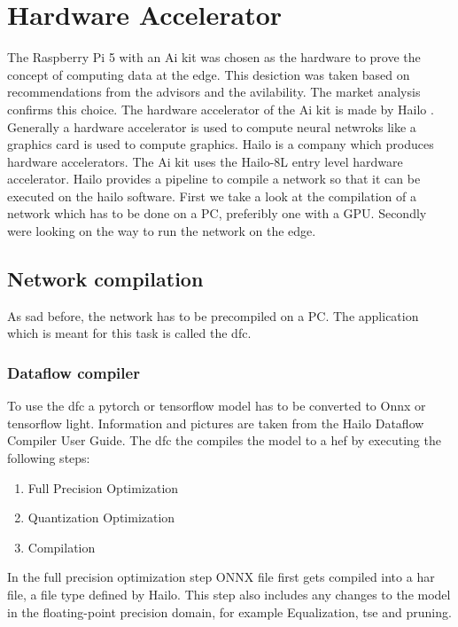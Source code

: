 \chapter{Hardware Accelerator}

The Raspberry Pi 5 with an Ai kit was chosen as the hardware to prove the concept of computing data at the edge.
This desiction was taken based on recommendations from the advisors and the avilability.
The market analysis confirms this choice.
The hardware accelerator of the Ai kit is made by Hailo \cite{hailo}.
Generally a hardware accelerator is used to compute neural netwroks like a graphics card is used to compute graphics.
Hailo is a company which produces hardware accelerators.
The Ai kit uses the Hailo-8L entry level hardware accelerator.
Hailo provides a pipeline to compile a network so that it can be executed on the hailo software.
First we take a look at the compilation of a network which has to be done on a PC, 
preferibly one with a GPU.
Secondly were looking on the way to run the network on the edge.

\section{Network compilation}
As sad before, the network has to be precompiled on a PC.
The application which is meant for this task is called the \Acrfull{dfc}.

\subsection{Dataflow compiler
\label{section:dfc}}

To use the \acrshort{dfc} a pytorch or tensorflow model has to be converted to Onnx or tensorflow light.
Information and pictures are taken from the Hailo Dataflow Compiler User Guide\cite{hailo_dataflow_compiler}.
The \acrshort{dfc} the compiles the model to a \Acrfull{hef} by executing the following steps:

\begin{enumerate}
    \item Full Precision Optimization
    \item Quantization Optimization
    \item Compilation
\end{enumerate}
In the full precision optimization step ONNX file first gets compiled into a \acrfull{har} file, a file type defined by Hailo.
This step also includes any changes to the model in the floating-point precision domain, for example Equalization\cite{meller2019same}, \acrshort{tse}\cite{Vosco_2021_ICCV} and pruning.

